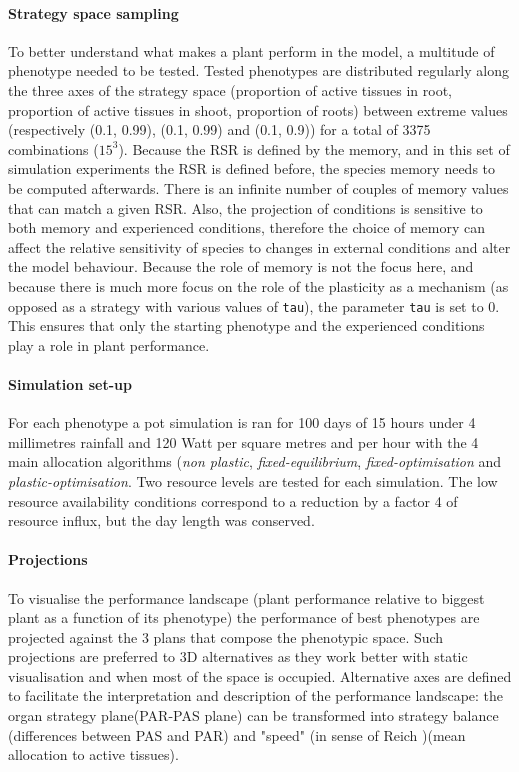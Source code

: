 \paragraph{Strategy space sampling}
To better understand what makes a plant perform in the model, a multitude of phenotype needed to be tested. Tested phenotypes are distributed regularly along the three axes of the strategy space (proportion of active tissues in root, proportion of active tissues in shoot, proportion of roots) between extreme values (respectively (0.1, 0.99), (0.1, 0.99) and (0.1, 0.9)) for a total of 3375 combinations ($15^{3}$).  Because the RSR is defined by the memory, and in this set of simulation experiments the RSR is defined before, the species memory needs to be computed afterwards. There is an infinite number of couples of memory values that can match a given RSR. Also, the projection of conditions is sensitive to both memory and experienced conditions, therefore the choice of memory can affect the relative sensitivity of species to changes in external conditions and alter the model behaviour. Because the role of memory is not the focus here, and because there is much more focus on the role of the plasticity as a mechanism (as opposed as a strategy with various values of \texttt{tau}), the parameter \texttt{tau} is set to 0. This ensures that only the starting phenotype and the experienced conditions play a role in plant performance.

\paragraph{Simulation set-up}

For each phenotype a pot simulation is ran for 100 days of 15 hours under 4 millimetres rainfall and 120 Watt per square metres and per hour with the 4 main allocation algorithms (\textit{non plastic}, \textit{fixed-equilibrium}, \textit{fixed-optimisation} and \textit{plastic-optimisation}. Two resource levels are tested for each simulation. The low resource availability conditions correspond to a reduction by a factor 4 of resource influx, but the day length was conserved.

\paragraph{Projections}

To visualise the performance landscape (plant performance relative to biggest plant as a function of its phenotype) the performance of best phenotypes are projected against the 3 plans that compose the phenotypic space. Such projections are preferred to 3D alternatives as they work better with static visualisation and when most of the space is occupied. Alternative axes are defined to facilitate the interpretation and description of the performance landscape: the organ strategy plane(PAR-PAS plane) can be transformed into strategy balance (differences between PAS and PAR) and "speed" (in sense of Reich \parencite{reich_world-wide_2014})(mean allocation to active tissues).

